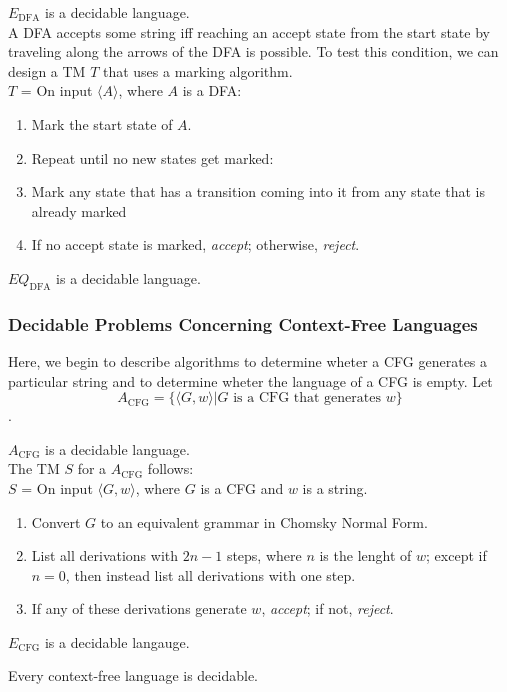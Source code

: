 \documentclass{article}
\begin{document}
\begin{theorem}
  $E_{\textrm{DFA}}$ is a decidable language. \\ 
  
  A DFA accepts some string iff reaching an accept state from the start state by traveling along the arrows of the DFA is possible. To test this condition, we can design a TM $T$ that uses a marking algorithm. \\ 
  $T$ = On input $\langle A \rangle$, where $A$ is a DFA: 
  \begin{enumerate}
    \item Mark the start state of $A$. 
    \item Repeat until no new states get marked: 
    \item \indent Mark any state that has a transition coming into it from any state that is already marked 
    \item If no accept state is marked, \emph{accept}; otherwise, \emph{reject}. 
  \end{enumerate}
\end{theorem}

\begin{theorem}
  $EQ_{\textrm{DFA}}$ is a decidable language. 
\end{theorem}

\subsubsection{Decidable Problems Concerning Context-Free Languages}

Here, we begin to describe algorithms to determine wheter a CFG generates a particular string and to determine wheter the language of a CFG is empty. Let $$A_{\textrm{CFG}} = \{\langle G,w \rangle | G \textrm{ is a CFG that generates } w\}$$. 

\begin{theorem}
  $A_{\textrm{CFG}}$ is a decidable language. \\ 

  The TM $S$ for a $A_{\textrm{CFG}}$ follows: \\ 
  $S$ = On input $\langle G,w \rangle$, where $G$ is a CFG and $w$ is a string.  
  \begin{enumerate}
    \item Convert $G$ to an equivalent grammar in Chomsky Normal Form. 
    \item List all derivations with $2n-1$ steps, where $n$ is the lenght of $w$; except if $n=0$, then instead list all derivations with one step. 
    \item If any of these derivations generate $w$, \emph{accept}; if not, \emph{reject}. 
  \end{enumerate}
\end{theorem}

\begin{theorem}
  $E_{\textrm{CFG}}$ is a decidable langauge. 
\end{theorem}

\begin{theorem}
  Every context-free language is decidable. 
\end{theorem}

\end{document}
